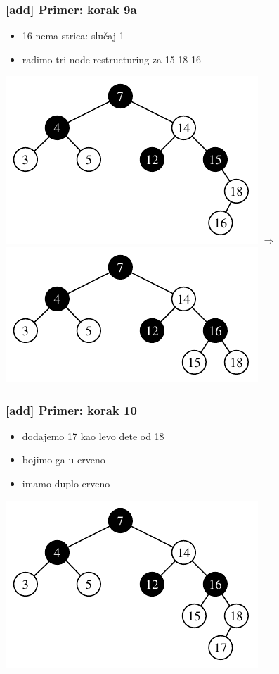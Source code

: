 \documentclass[compress]{beamer}
\begin{document}
\begin{frame}[fragile]
  \frametitle{[add] Primer: korak 9a}
  \begin{itemize}
    \item 16 nema strica: slučaj 1
    \item radimo tri-node restructuring za 15-18-16
  \end{itemize}
  \begin{center}
    \includegraphics[scale=0.8]{asp-11-add-13.pdf} $\Rightarrow$
    \includegraphics[scale=0.8]{asp-11-add-14.pdf}
  \end{center}
\end{frame}

\begin{frame}[fragile]
  \frametitle{[add] Primer: korak 10}
  \begin{itemize}
    \item dodajemo 17 kao levo dete od 18
    \item bojimo ga u crveno
    \item imamo duplo crveno
  \end{itemize}
  \begin{center}
    \includegraphics[scale=0.8]{asp-11-add-15.pdf}
  \end{center}
\end{frame}
\end{document}
